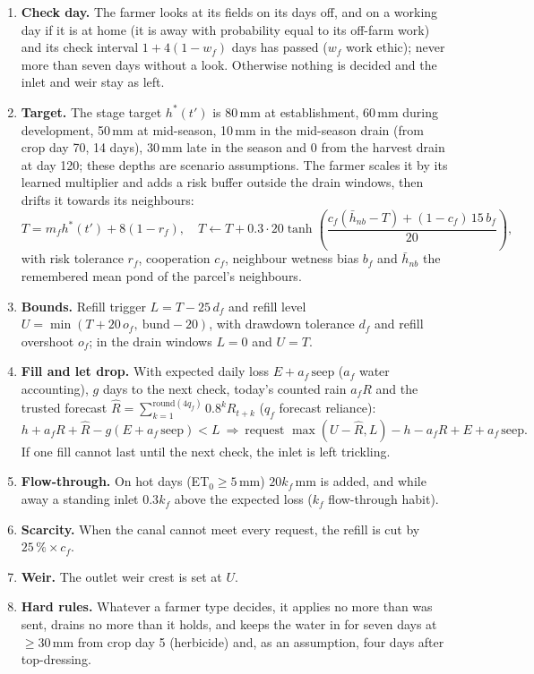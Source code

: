 \documentclass[11pt]{article}
\begin{document}
\begin{enumerate}
\item \textbf{Check day.} The farmer looks at its fields on its days off, and on a working day if it is at home (it is away with probability equal to its off-farm work) and its check interval $1 + 4(1 - w_f)$ days has passed ($w_f$ work ethic); never more than seven days without a look. Otherwise nothing is decided and the inlet and weir stay as left.
\item \textbf{Target.} The stage target $h^*(t')$ is 80\,mm at establishment, 60\,mm during development, 50\,mm at mid-season, 10\,mm in the mid-season drain (from crop day 70, 14 days), 30\,mm late in the season and 0 from the harvest drain at day 120; these depths are scenario assumptions. The farmer scales it by its learned multiplier and adds a risk buffer outside the drain windows, then drifts it towards its neighbours:
\begin{equation}
T = m_f h^*(t') + 8(1 - r_f), \quad T \leftarrow T + 0.3 \cdot 20 \tanh\!\left(\frac{c_f(\bar h_{nb} - T) + (1 - c_f)\,15\,b_f}{20}\right),
\end{equation}
with risk tolerance $r_f$, cooperation $c_f$, neighbour wetness bias $b_f$ and $\bar h_{nb}$ the remembered mean pond of the parcel's neighbours.
\item \textbf{Bounds.} Refill trigger $L = T - 25\,d_f$ and refill level $U = \min(T + 20\,o_f,\ \text{bund} - 20)$, with drawdown tolerance $d_f$ and refill overshoot $o_f$; in the drain windows $L = 0$ and $U = T$.
\item \textbf{Fill and let drop.} With expected daily loss $E + a_f\,\text{seep}$ ($a_f$ water accounting), $g$ days to the next check, today's counted rain $a_f R$ and the trusted forecast $\hat R = \sum_{k=1}^{\mathrm{round}(4q_f)} 0.8^k R_{t+k}$ ($q_f$ forecast reliance):
\begin{equation}
h + a_f R + \hat R - g(E + a_f\,\text{seep}) < L \ \Rightarrow\ \text{request } \max(U - \hat R, L) - h - a_f R + E + a_f\,\text{seep}.
\end{equation}
If one fill cannot last until the next check, the inlet is left trickling.
\item \textbf{Flow-through.} On hot days (ET$_0 \ge 5$\,mm) $20 k_f$\,mm is added, and while away a standing inlet $0.3 k_f$ above the expected loss ($k_f$ flow-through habit).
\item \textbf{Scarcity.} When the canal cannot meet every request, the refill is cut by $25\,\%\times c_f$.
\item \textbf{Weir.} The outlet weir crest is set at $U$.
\item \textbf{Hard rules.} Whatever a farmer type decides, it applies no more than was sent, drains no more than it holds, and keeps the water in for seven days at $\ge 30$\,mm from crop day 5 (herbicide) and, as an assumption, four days after top-dressing.
\end{enumerate}
\end{document}
